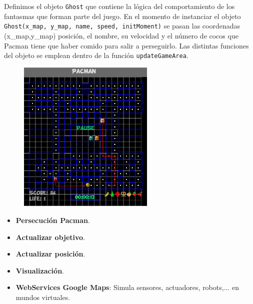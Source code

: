 \documentclass[notes,slidesec,a4]{seminar}
\begin{document}
\begin{hslide}
Definimos el objeto \texttt{Ghost} que contiene la lógica del comportamiento de los fantasmas que forman parte del juego. En el momento de instanciar el objeto \texttt{Ghost(x\_map, y\_map, name, speed, initMoment)} se pasan las coordenadas (x\_map,y\_map) posición, el nombre, su velocidad y el número de cocos que Pacman tiene que haber comido para salir a perseguirlo. Las distintas funciones del objeto se emplean dentro de la función \texttt{updateGameArea}. 
\begin{minipage}{8cm}
\begin{center}
\begin{figure}
\includegraphics[width=6.5cm]{img/SeguimientoGhost.png}
\end{figure}
\end{center}
\end{minipage}
\begin{itemize}
\item \textbf{Persecución Pacman}.
\item \textbf{Actualizar objetivo}.
\item \textbf{Actualizar posición}.
\item \textbf{Visualización}.
\end{itemize}
\end{hslide}


\begin{hslide}
\begin{itemize}
\item \textbf{WebServices Google Maps}: Simula sensores, actuadores, robots,... en mundos virtuales.
\end{itemize}
\end{hslide}
\end{document}

